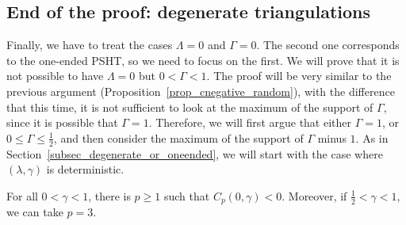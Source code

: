 \documentclass[AHL,Unicode,longabstracts,published]{cedram}
\begin{document}
\subsection{End of the proof: degenerate triangulations}\label{subsec_end_proof}

Finally, we have to treat the cases $\Lambda=0$ and $\Gamma=0$. The second one corresponds to the one-ended PSHT, so we need to focus on the first. We will prove that it is not possible to have $\Lambda=0$ but $0<\Gamma<1$. The proof will be very similar to the previous argument (Proposition~\ref{prop_cnegative_random}), with the difference that this time, it is not sufficient to look at the maximum of the support of $\Gamma$, since it is possible that $\Gamma=1$. Therefore, we will first argue that either $\Gamma=1$, or $0 \leq \Gamma \leq \frac{1}{2}$, and then consider the maximum of the support of $\Gamma$ minus $1$. As in Section~\ref{subsec_degenerate_or_oneended}, we will start with the case where $(\lambda,\gamma)$ is deterministic.

\begin{lemm}\label{lem_cnegative_deter_lambdazero}
For all $0<\gamma<1$, there is $p \geq 1$ such that $C_p(0,\gamma)<0$. Moreover, if $\frac{1}{2}<\gamma<1$, we can take $p=3$.
\end{lemm}
\end{document}
